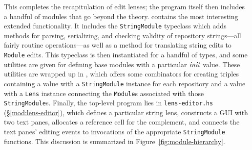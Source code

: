 This completes the recapitulation of edit lenses; the program itself then
includes a handful of modules that go beyond the theory.
 contains the most interesting extended
functionality. It includes the \texttt{StringModule} typeclass which adds
methods for parsing, serializing, and checking validity of repository
strings---all fairly routine operations---as well as a method for
translating string edits to \texttt{Module} edits. This typeclass is then
instantiated for a handful of types, and some utilities are given for
defining base modules with a particular $\mathit{init}$ value. These utilities are
wrapped up in , which offers some combinators
for creating triples containing a value with a \texttt{StringModule}
instance for each repository and a value with a \texttt{Lens} instance
connecting the \texttt{Module}s associated with those
\texttt{StringModule}s. Finally, the top-level program lies in
\texttt{lens-editor.hs} (\S\ref{mod:lens-editor}), which defines a
particular string lens, constructs a GUI with two text panes, allocates a
reference cell for the complement, and connects the text panes' editing
events to invocations of the appropriate \texttt{StringModule} functions.
This discussion is summarized in Figure~\ref{fig:module-hierarchy}.

